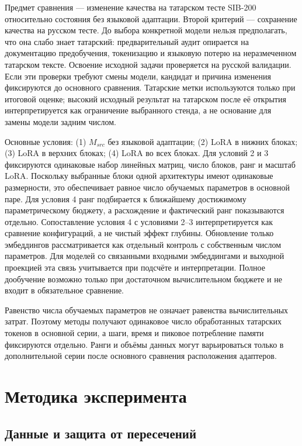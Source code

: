 \documentclass{misisarticle}
\begin{document}
Предмет сравнения — изменение качества на татарском тесте SIB-200 относительно состояния без языковой адаптации. Второй критерий — сохранение качества на русском тесте. До выбора конкретной модели нельзя предполагать, что она слабо знает татарский: предварительный аудит опирается на документацию предобучения, токенизацию и языковую потерю на неразмеченном татарском тексте. Освоение исходной задачи проверяется на русской валидации. Если эти проверки требуют смены модели, кандидат и причина изменения фиксируются до основного сравнения. Татарские метки используются только при итоговой оценке; высокий исходный результат на татарском после её открытия интерпретируется как ограничение выбранного стенда, а не основание для замены модели задним числом.

Основные условия: (1) $M_{src}$ без языковой адаптации; (2) LoRA в нижних блоках; (3) LoRA в верхних блоках; (4) LoRA во всех блоках. Для условий 2 и 3 фиксируются одинаковые набор линейных матриц, число блоков, ранг и масштаб LoRA. Поскольку выбранные блоки одной архитектуры имеют одинаковые размерности, это обеспечивает равное число обучаемых параметров в основной паре. Для условия 4 ранг подбирается к ближайшему достижимому параметрическому бюджету, а расхождение и фактический ранг показываются отдельно. Сопоставление условия 4 с условиями 2–3 интерпретируется как сравнение конфигураций, а не чистый эффект глубины. Обновление только эмбеддингов рассматривается как отдельный контроль с собственным числом параметров. Для моделей со связанными входными эмбеддингами и выходной проекцией эта связь учитывается при подсчёте и интерпретации. Полное дообучение возможно только при достаточном вычислительном бюджете и не входит в обязательное сравнение.

Равенство числа обучаемых параметров не означает равенства вычислительных затрат. Поэтому методы получают одинаковое число обработанных татарских токенов в основной серии, а шаги, время и пиковое потребление памяти фиксируются отдельно. Ранги и объёмы данных могут варьироваться только в дополнительной серии после основного сравнения расположения адаптеров.

\section{Методика эксперимента}

\subsection{Данные и защита от пересечений}
\end{document}
